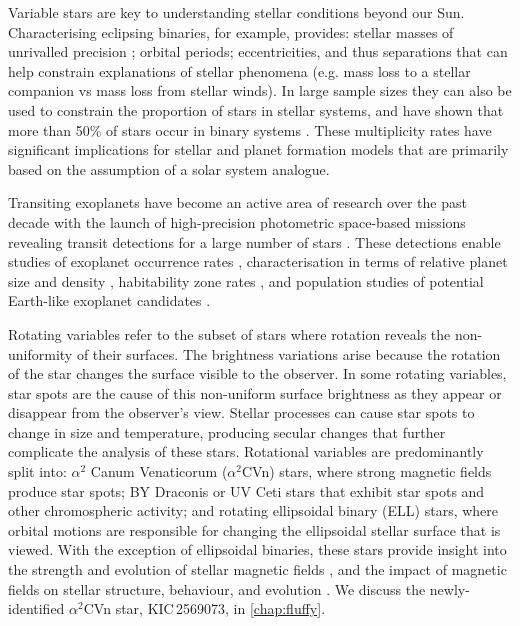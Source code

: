 Variable stars are key to understanding stellar conditions beyond our Sun. Characterising eclipsing binaries, for example, provides: stellar masses of unrivalled precision \citep{torres_accurate_2010,rebassa-mansergas_accurate_2019}; orbital periods; eccentricities, and thus separations that can help constrain explanations of stellar phenomena (e.g. mass loss to a stellar companion vs mass loss from stellar winds). In large sample sizes they can also be used to constrain the proportion of stars in stellar systems, and have shown that more than 50\% of stars occur in binary systems \citep{raghavan_survey_2010, duchene_stellar_2013, moe_mind_2016, guszejnov_protostellar_2017}. These multiplicity rates have significant implications for stellar and planet formation models that are primarily based on the assumption of a solar system analogue.

Transiting exoplanets have become an active area of research over the past decade with the launch of high-precision photometric space-based missions revealing transit detections for a large number of stars \cite[eg.][and references therein]{zhu_about_2018,perryman_exoplanet_2018}. These detections enable studies of exoplanet occurrence rates \cite[eg.][]{narang_properties_2018}, characterisation in terms of relative planet size and density \citep{batalha_exploring_2014}, habitability zone rates \citep{gaidos_candidate_2013}, and population studies of potential Earth-like exoplanet candidates \citep{petigura_prevalence_2013, zhu_about_2018}.

Rotating variables refer to the subset of stars where rotation reveals the non-uniformity of their surfaces. The brightness variations arise because the rotation of the star changes the surface visible to the observer. In some rotating variables, star spots are the cause of this non-uniform surface brightness as they appear or disappear from the observer’s view. Stellar processes can cause star spots to change in size and temperature, producing secular changes that further complicate the analysis of these stars. Rotational variables are predominantly split into: $\alpha^2$ Canum Venaticorum ($\alpha^2$CVn) stars, where strong magnetic fields produce star spots; BY Draconis or UV Ceti stars that exhibit star spots and other chromospheric activity; and rotating ellipsoidal binary (ELL) stars, where orbital motions are responsible for changing the ellipsoidal stellar surface that is viewed. With the exception of ellipsoidal binaries, these stars provide insight into the strength and evolution of stellar magnetic fields \citep{berdyugina_starspots_2005}, and the impact of magnetic fields on stellar structure, behaviour, and evolution \citep{moss_dynamo_2004}. We discuss the newly-identified $\alpha^2$CVn star, KIC\,2569073, in \cref{chap:fluffy}.%

